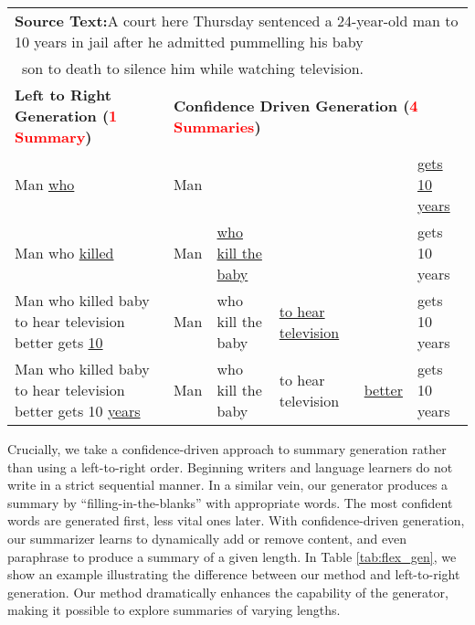 \documentclass[11pt]{article}
\begin{document}
\begin{table*}
\setlength{\tabcolsep}{2pt}
\renewcommand{\arraystretch}{1.15}
\centering
\begin{fontpbk}
\begin{scriptsize}
\begin{tabular}{|l||lllll|}
\hline
\multicolumn{6}{|l|}{\textbf{Source Text:}\quad A court here Thursday sentenced a 24-year-old man to 10 years in jail after he admitted pummelling his baby}\\
\multicolumn{6}{|l|}{\quad\quad\quad\quad\quad\quad\, son to death to silence him while watching television.}\\
\hline
\hline
\textbf{Left to Right Generation (\textcolor{red}{1 Summary})} & \multicolumn{5}{l|}{\textbf{Confidence Driven Generation (\textcolor{red}{4 Summaries})}}\\
Man \colorbox{yellow!30}{\underline{who}} & Man & & & & \colorbox{yellow!30}{\underline{gets 10 years}}\\
Man who \colorbox{yellow!30}{\underline{killed}} \quad [\dots] & Man & \colorbox{yellow!30}{\underline{who kill the baby}} & & & gets 10 years\\
Man who killed baby to hear television better gets \colorbox{yellow!30}{\underline{10}} & Man & who kill the baby & \colorbox{yellow!30}{\underline{to hear television}} & & gets 10 years\\
Man who killed baby to hear television better gets 10 \colorbox{yellow!30}{\underline{years}} & Man & who kill the baby & to hear television & \colorbox{yellow!30}{\underline{better}} & gets 10 years\\
\hline
\end{tabular}
\end{scriptsize}
\end{fontpbk}
\caption{
An example of the difference between left-to-right and confidence-driven summary generation. 
(\textsc{Left}) A single summary is produced in a left-to-right order.
(\textsc{Right}) Four summaries are generated in a confidence-driven mode. 
The most confident words are generated first, less vital ones later. 
Our generator learns to dynamically add or remove content given a target length to produce summaries of varying lengths—short, medium and long. 
The output is a diverse set of alternative summaries.
}
\label{tab:flex_gen}
\end{table*}


Crucially, we take a confidence-driven approach to summary generation rather than using a left-to-right order. 
Beginning writers and language learners do not write in a strict sequential manner. 
In a similar vein, our generator produces a summary by ``filling-in-the-blanks'' with appropriate words.
The most confident words are generated first, less vital ones later.
With confidence-driven generation, our summarizer learns to dynamically add or remove content, and even paraphrase to produce a summary of a given length.
In Table \ref{tab:flex_gen}, we show an example illustrating the difference between our method and left-to-right generation.
Our method dramatically enhances the capability of the generator, making it possible to explore summaries of varying lengths.
\end{document}
